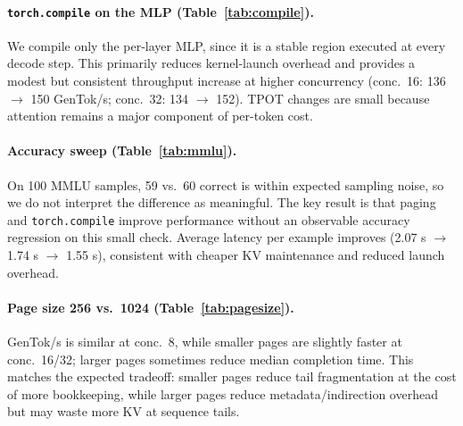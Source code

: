 \documentclass[11pt]{article}
\begin{document}
\paragraph{\texttt{torch.compile} on the MLP (Table~\ref{tab:compile}).}
We compile only the per-layer MLP, since it is a stable region executed at every decode step. This primarily reduces kernel-launch overhead and provides a modest but consistent throughput increase at higher concurrency (conc.\ 16: 136 \(\rightarrow\) 150 GenTok/s; conc.\ 32: 134 \(\rightarrow\) 152). TPOT changes are small because attention remains a major component of per-token cost.

\paragraph{Accuracy sweep (Table~\ref{tab:mmlu}).}
On 100 MMLU samples, 59 vs.\ 60 correct is within expected sampling noise, so we do not interpret the difference as meaningful. The key result is that paging and \texttt{torch.compile} improve performance without an observable accuracy regression on this small check. Average latency per example improves (2.07 s \(\rightarrow\) 1.74 s \(\rightarrow\) 1.55 s), consistent with cheaper KV maintenance and reduced launch overhead.

\paragraph{Page size 256 vs.\ 1024 (Table~\ref{tab:pagesize}).}
GenTok/s is similar at conc.\ 8, while smaller pages are slightly faster at conc.\ 16/32; larger pages sometimes reduce median completion time. This matches the expected tradeoff: smaller pages reduce tail fragmentation at the cost of more bookkeeping, while larger pages reduce metadata/indirection overhead but may waste more KV at sequence tails.
\end{document}
